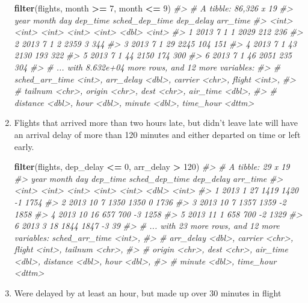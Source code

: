 \documentclass[]{book}
\newenvironment{Shaded}{\begin{snugshade}}{\end{snugshade}}
\newcommand{\CommentTok}[1]{\textcolor[rgb]{0.56,0.35,0.01}{\textit{#1}}}
\newcommand{\DecValTok}[1]{\textcolor[rgb]{0.00,0.00,0.81}{#1}}
\newcommand{\KeywordTok}[1]{\textcolor[rgb]{0.13,0.29,0.53}{\textbf{#1}}}
\newcommand{\NormalTok}[1]{#1}
\newcommand{\OperatorTok}[1]{\textcolor[rgb]{0.81,0.36,0.00}{\textbf{#1}}}
\newcommand{\StringTok}[1]{\textcolor[rgb]{0.31,0.60,0.02}{#1}}
\theoremstyle{plain}
\theoremstyle{remark}
\theoremstyle{definition}
\theoremstyle{definition}
\theoremstyle{definition}
\theoremstyle{remark}
\begin{document}
\begin{enumerate}
\begin{Shaded}
\begin{Highlighting}[]
\KeywordTok{filter}\NormalTok{(flights, month }\OperatorTok{>=}\StringTok{ }\DecValTok{7}\NormalTok{, month }\OperatorTok{<=}\StringTok{ }\DecValTok{9}\NormalTok{)}
\CommentTok{#> # A tibble: 86,326 x 19}
\CommentTok{#>    year month   day dep_time sched_dep_time dep_delay arr_time}
\CommentTok{#>   <int> <int> <int>    <int>          <int>     <dbl>    <int>}
\CommentTok{#> 1  2013     7     1        1           2029       212      236}
\CommentTok{#> 2  2013     7     1        2           2359         3      344}
\CommentTok{#> 3  2013     7     1       29           2245       104      151}
\CommentTok{#> 4  2013     7     1       43           2130       193      322}
\CommentTok{#> 5  2013     7     1       44           2150       174      300}
\CommentTok{#> 6  2013     7     1       46           2051       235      304}
\CommentTok{#> # ... with 8.632e+04 more rows, and 12 more variables:}
\CommentTok{#> #   sched_arr_time <int>, arr_delay <dbl>, carrier <chr>, flight <int>,}
\CommentTok{#> #   tailnum <chr>, origin <chr>, dest <chr>, air_time <dbl>,}
\CommentTok{#> #   distance <dbl>, hour <dbl>, minute <dbl>, time_hour <dttm>}
\end{Highlighting}
\end{Shaded}
\item
  Flights that arrived more than two hours late, but didn't leave late
  will have an arrival delay of more than 120 minutes and either
  departed on time or left early.

\begin{Shaded}
\begin{Highlighting}[]
\KeywordTok{filter}\NormalTok{(flights, dep_delay }\OperatorTok{<=}\StringTok{ }\DecValTok{0}\NormalTok{, arr_delay }\OperatorTok{>}\StringTok{ }\DecValTok{120}\NormalTok{)}
\CommentTok{#> # A tibble: 29 x 19}
\CommentTok{#>    year month   day dep_time sched_dep_time dep_delay arr_time}
\CommentTok{#>   <int> <int> <int>    <int>          <int>     <dbl>    <int>}
\CommentTok{#> 1  2013     1    27     1419           1420        -1     1754}
\CommentTok{#> 2  2013    10     7     1350           1350         0     1736}
\CommentTok{#> 3  2013    10     7     1357           1359        -2     1858}
\CommentTok{#> 4  2013    10    16      657            700        -3     1258}
\CommentTok{#> 5  2013    11     1      658            700        -2     1329}
\CommentTok{#> 6  2013     3    18     1844           1847        -3       39}
\CommentTok{#> # ... with 23 more rows, and 12 more variables: sched_arr_time <int>,}
\CommentTok{#> #   arr_delay <dbl>, carrier <chr>, flight <int>, tailnum <chr>,}
\CommentTok{#> #   origin <chr>, dest <chr>, air_time <dbl>, distance <dbl>, hour <dbl>,}
\CommentTok{#> #   minute <dbl>, time_hour <dttm>}
\end{Highlighting}
\end{Shaded}
\item
  Were delayed by at least an hour, but made up over 30 minutes in
  flight


\end{enumerate}
\end{document}
